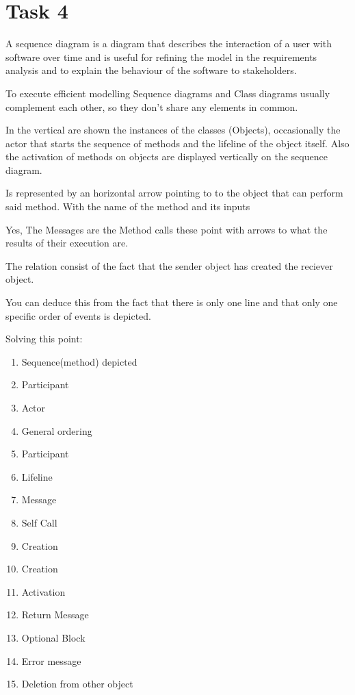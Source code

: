 \chapter{Task 4}
\begin{parlist}
	\item  A sequence diagram is a diagram that describes the interaction of a user with software over time and is useful for refining the model in the requirements analysis and to explain the behaviour of the software to stakeholders.
	\item To execute efficient modelling Sequence diagrams and Class diagrams usually complement each other, so they don't share any elements in common.
	\item In the vertical are shown the instances of the classes (Objects), occasionally the actor that starts the sequence of methods and the lifeline of the object itself. Also the activation of methods on objects are displayed vertically on the sequence diagram.
	\item Is represented by an horizontal arrow pointing to to the object that can perform said method. With the name of the method and its inputs
	\item Yes, The Messages are the Method calls these point with arrows to what the results of their execution are.
	\item The relation consist of the fact that the sender object has created the reciever object.
	\item You can deduce this from the fact that there is only one line and that only one specific order of events is depicted.
	\item Solving this point:
	\begin{enumerate}
		\item Sequence(method) depicted
		\item Participant 
		\item Actor
		\item General ordering
		\item Participant
		\item Lifeline
		\item Message
		\item Self Call
		\item Creation
		\item Creation
		\item Activation
		\item Return Message
		\item Optional Block
		\item Error message
		\item Deletion from other object
	\end{enumerate}
\end{parlist}
